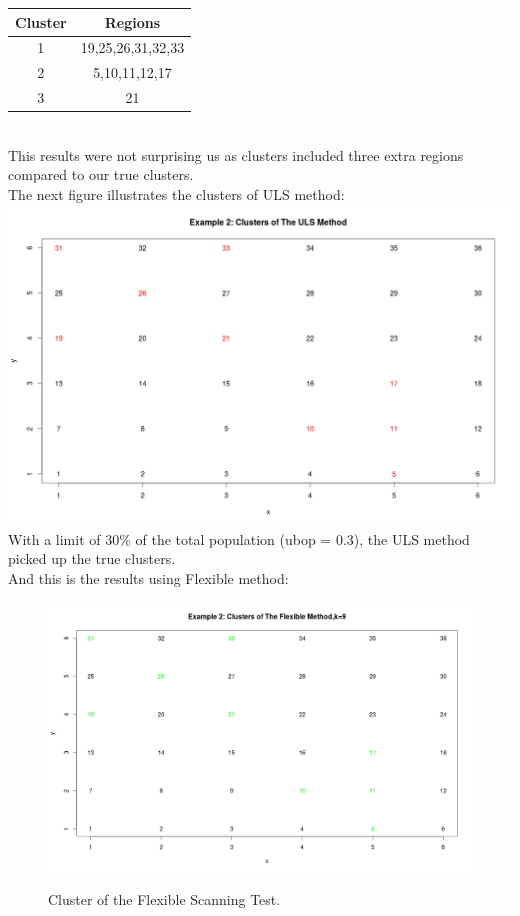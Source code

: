 \documentclass[12pt]{article}
\begin{document}
\hspace{4cm}\begin{tabular}{|c|c|}
	\hline
	Cluster & Regions \\
	\hline
	1 & 19,25,26,31,32,33 \\
	2 & 5,10,11,12,17 \\ 
	3 & 21 \\ \hline
\end{tabular} \\

This results were not surprising us as clusters included three extra regions compared to our true clusters.\\

The next figure illustrates the clusters of ULS method: \\ 
\includegraphics[scale=0.2]{Ex2:ULS}\\
With a limit of $30 \% $  of the total population (ubop = 0.3), the ULS method picked up the true clusters.\\

And this is the results using Flexible method:\\

\begin{figure}[!ht]
	
\centering
\includegraphics[scale=0.2]{ex2:Flexible}\\
\caption{Cluster of the Flexible Scanning Test.\label{f:gull}}

\end{figure}
\end{document}
